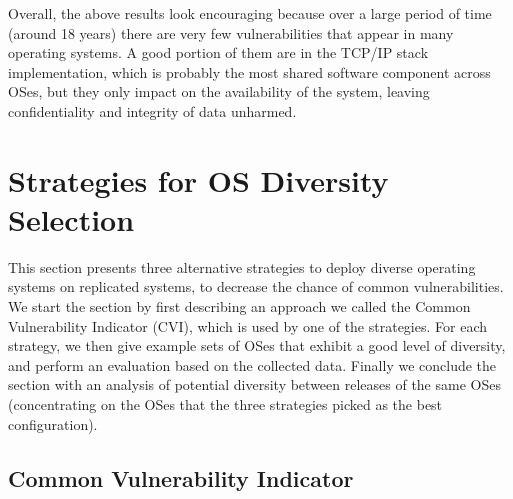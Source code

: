 Overall, the above results look encouraging because over a large period of time (around 18 years) there are very few vulnerabilities that appear in many operating systems. A good portion of them are in the TCP/IP stack implementation, which is probably the most shared software component across OSes, but they only impact on the availability of the system, leaving confidentiality and integrity of data unharmed.



\section{Strategies for OS Diversity Selection}\label{evaluation}

This section presents three alternative strategies to deploy diverse operating systems on replicated systems, to decrease the chance of common vulnerabilities. We start the section by first describing an approach we called the Common Vulnerability Indicator (CVI), which is used by one of the strategies. For each strategy, we then give example sets of OSes that exhibit a good level of diversity, and perform an evaluation based on the collected data. Finally we conclude the section with an analysis of potential diversity between releases of the same OSes (concentrating on the OSes that the three strategies picked as the best configuration).

\subsection*{Common Vulnerability Indicator}\label{cvi}

